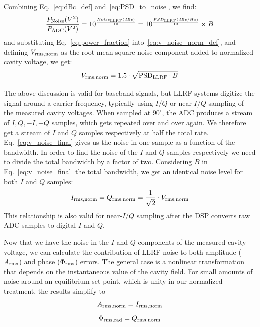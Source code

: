 \documentclass[a4paper,12pt]{article}
\begin{document}
Combining Eq.~\ref{eq:dBc_def} and~\ref{eq:PSD_to_noise}, we find:
\begin{equation}
 \centering \frac{P_{\rm Noise}(V^2)}{P_{\rm ADC}(V^2)} = 10^{\frac{Noise_{\rm LLRF}(dBc)}{10}} = 10^{\frac{PSD_{\rm LLRF}(dBc/Hz)}{10}} \times B
 \label{eq:power_fraction}
\end{equation}
and substituting Eq.~\ref{eq:power_fraction} into~\ref{eq:v_noise_norm_def},
and defining $V_{\rm rms,norm}$ as the root-mean-square noise component added to
normalized cavity voltage, we get:
\begin{equation}
  \centering V_{\rm rms,norm} = 1.5 \cdot \sqrt{{\rm PSD}_{\rm LLRF} \cdot B}
  \label{eq:v_noise_final}
\end{equation}

The above discussion is valid for baseband signals, but LLRF systems digitize the signal
around a carrier frequency, typically using $I/Q$ or near-$I/Q$ sampling of the measured cavity voltages. When sampled at $90^\circ$, the ADC produces a stream of $I, Q, -I, -Q$ samples, which gets repeated over and over again. We therefore get a stream of $I$ and $Q$ samples respectively at half the total rate. Eq.~\eqref{eq:v_noise_final} gives us the noise in one sample as a function of the bandwidth. In order to find the noise of the $I$ and $Q$ samples respectively we need to divide the total bandwidth by a factor of two. Considering $B$ in Eq.~\eqref{eq:v_noise_final} the total bandwidth, we get an identical noise level for both $I$ and $Q$ samples:
\begin{equation}
  I_{\rm rms,norm}= Q_{\rm rms,norm} = \frac{1}{\sqrt{2}}\cdot V_{\rm rms,norm}
  \label{eq:i_q_vs_v_rms}
\end{equation}
This relationship is also valid for near-$I/Q$ sampling after the DSP converts raw ADC samples to digital
$I$ and $Q$.

Now that we have the noise in the $I$ and $Q$ components of the measured cavity voltage, we can calculate the contribution of LLRF noise to both amplitude ($A_{\rm rms}$) and phase ($\Phi_{\rm rms}$) errors.
The general case is a nonlinear transformation that depends on the instantaneous value of the cavity field.
For small amounts of noise around an equilibrium set-point, which is unity in our normalized treatment,
the results simplify to
\begin{equation}
  A_{\rm rms,norm} = I_{\rm rms,norm}
  \label{eq:a_noise}
\end{equation}
\begin{equation}
  \Phi_{\rm rms,rad} = Q_{\rm rms,norm}
  \label{eq:p_noise}
\end{equation}
\end{document}
